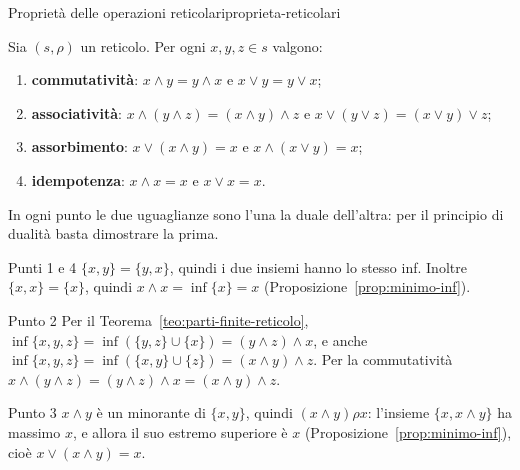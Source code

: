 \begin{concetto}
\begin{Teorema}{Proprietà delle operazioni reticolari}{proprieta-reticolari}
    \begin{prerequisiti}
    \end{prerequisiti}
    Sia $(s, \rho)$ un reticolo. Per ogni $x, y, z \in s$ valgono:
    \begin{enumerate}
        \item \textbf{commutatività}: $x \wedge y = y \wedge x$ e $x \vee y = y \vee x$;
        \item \textbf{associatività}: $x \wedge (y \wedge z) = (x \wedge y) \wedge z$ e $x \vee (y \vee z) = (x \vee y) \vee z$;
        \item \textbf{assorbimento}: $x \vee (x \wedge y) = x$ e $x \wedge (x \vee y) = x$;
        \item \textbf{idempotenza}: $x \wedge x = x$ e $x \vee x = x$.
    \end{enumerate}
\end{Teorema}
\begin{dimostrazione}
    In ogni punto le due uguaglianze sono l'una la duale dell'altra: per il principio di dualità basta dimostrare la prima.
    \begin{caso}{Punti 1 e 4}
        $\{x, y\} = \{y, x\}$, quindi i due insiemi hanno lo stesso inf. Inoltre $\{x, x\} = \{x\}$, quindi $x \wedge x = \inf\{x\} = x$ (Proposizione~\ref{prop:minimo-inf}).
    \end{caso}
    \begin{caso}{Punto 2}
        Per il Teorema~\ref{teo:parti-finite-reticolo}, $\inf\{x, y, z\} = \inf(\{y, z\} \cup \{x\}) = (y \wedge z) \wedge x$, e anche $\inf\{x, y, z\} = \inf(\{x, y\} \cup \{z\}) = (x \wedge y) \wedge z$.
        Per la commutatività $x \wedge (y \wedge z) = (y \wedge z) \wedge x = (x \wedge y) \wedge z$.
    \end{caso}
    \begin{caso}{Punto 3}
        $x \wedge y$ è un minorante di $\{x, y\}$, quindi $(x \wedge y) \rho x$: l'insieme $\{x, x \wedge y\}$ ha massimo $x$, e allora il suo estremo superiore è $x$
        (Proposizione~\ref{prop:minimo-inf}), cioè $x \vee (x \wedge y) = x$.
    \end{caso}
\end{dimostrazione}
\end{concetto}

